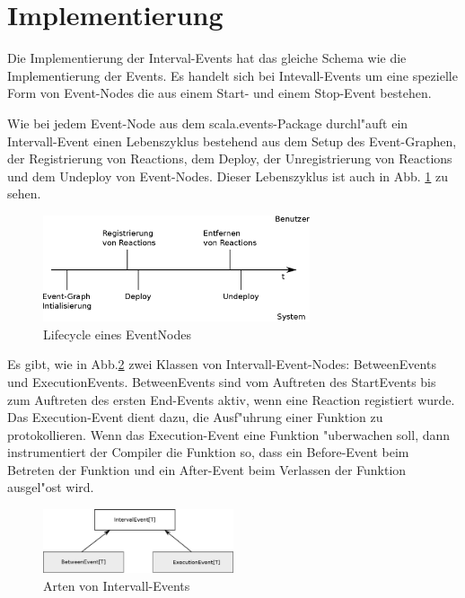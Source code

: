 \section{Implementierung}

Die Implementierung der Interval-Events hat das gleiche Schema wie die
Implementierung der Events. Es handelt sich bei Intevall-Events um eine
spezielle Form von Event-Nodes die aus einem Start- und einem Stop-Event
bestehen.

Wie bei jedem Event-Node aus dem scala.events-Package durchl"auft ein
Intervall-Event einen Lebenszyklus bestehend aus dem Setup des Event-Graphen,
der Registrierung von Reactions, dem Deploy, der Unregistrierung von Reactions
und dem Undeploy von Event-Nodes. Dieser Lebenszyklus ist auch in
Abb. \ref{event_node_lifecycle} zu sehen.

\begin{figure}[htp]
\begin{center}
  \includegraphics[width=0.7\textwidth]{graphics/EventNode-Lifecycle}
  \caption{Lifecycle eines EventNodes}
  \label{event_node_lifecycle}
\end{center}
\end{figure}


Es gibt, wie in Abb.\ref{interval_events_structure} zwei Klassen von
Intervall-Event-Nodes: BetweenEvents und ExecutionEvents. BetweenEvents sind vom
Auftreten des StartEvents bis zum Auftreten des ersten End-Events aktiv, wenn
eine Reaction registiert wurde. Das Execution-Event dient dazu, die Ausf"uhrung
einer Funktion zu protokollieren. Wenn das Execution-Event eine Funktion
"uberwachen soll, dann instrumentiert der Compiler die Funktion so, dass ein
Before-Event beim Betreten der Funktion und ein After-Event beim Verlassen der
Funktion ausgel"ost wird.

\begin{figure}[htp]
\begin{center}
  \includegraphics[width=0.5\textwidth]{graphics/interval_event_structure}
  \caption{Arten von Intervall-Events}
  \label{interval_events_structure}
\end{center}
\end{figure}


